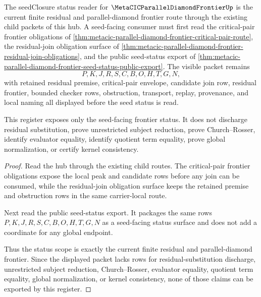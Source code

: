 \begin{theorem}
\label{thm:metacic-parallel-diamond-frontier-seed-status-scope-register}
The seedClosure status reader for $\MetaCICParallelDiamondFrontierUp$ is the current finite residual and parallel-diamond frontier route through the existing child packets of this hub. A seed-facing consumer must first read the critical-pair frontier obligations of \autoref{thm:metacic-parallel-diamond-frontier-critical-pair-route}, the residual-join obligation surface of \autoref{thm:metacic-parallel-diamond-frontier-residual-join-obligations}, and the public seed-status export of \autoref{thm:metacic-parallel-diamond-frontier-seed-status-public-export}. The visible packet remains
$$
P,K,J,R,S,C,B,O,H,T,G,N ,
$$
with retained residual premise, critical-pair envelope, candidate join row, residual frontier, bounded checker rows, obstruction, transport, replay, provenance, and local naming all displayed before the seed status is read.

This register exposes only the seed-facing frontier status. It does not discharge residual substitution, prove unrestricted subject reduction, prove Church--Rosser, identify evaluator equality, identify quotient term equality, prove global normalization, or certify kernel consistency.
\end{theorem}
\begin{proof}
Read the hub through the existing child routes. The critical-pair frontier obligations expose the local peak and candidate rows before any join can be consumed, while the residual-join obligation surface keeps the retained premise and obstruction rows in the same carrier-local route.

Next read the public seed-status export. It packages the same rows $P,K,J,R,S,C,B,O,H,T,G,N$ as a seed-facing status surface and does not add a coordinate for any global endpoint.

Thus the status scope is exactly the current finite residual and parallel-diamond frontier. Since the displayed packet lacks rows for residual-substitution discharge, unrestricted subject reduction, Church--Rosser, evaluator equality, quotient term equality, global normalization, or kernel consistency, none of those claims can be exported by this register.
\end{proof}
